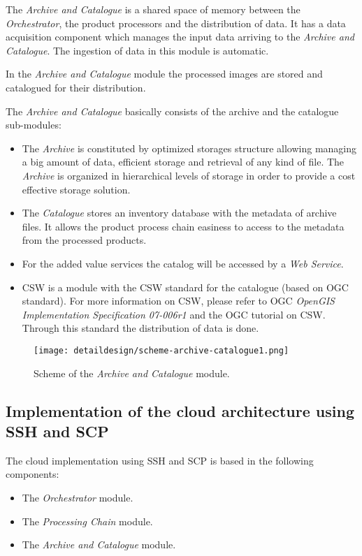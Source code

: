 The \emph{Archive and Catalogue} is a shared space of memory between the
\emph{Orchestrator}, the product processors and the distribution of data. It has
a data acquisition component which manages the input data arriving to the
\emph{Archive and Catalogue}. The ingestion of data in this module is automatic.

In the \emph{Archive and Catalogue} module the processed images are stored and catalogued for their distribution.

The \emph{Archive and Catalogue} basically consists of the archive and the
catalogue sub-modules:
\begin{itemize}
\item The \emph{Archive} is constituted by optimized storages structure allowing managing a big amount of data, efficient storage and retrieval of any kind of file. The \emph{Archive} is organized in hierarchical levels of storage in order to provide a cost effective storage solution.

\item The \emph{Catalogue} stores an inventory database with the metadata of archive files. It allows the product process chain easiness to access to the metadata from the processed products.

\item For the added value services the catalog will be accessed by a \emph{Web Service}.

\item \ac{CSW} is a module with the \ac{CSW} standard for the catalogue (based on \ac{OGC} standard). For more information on \ac{CSW}, please refer to \ac{OGC} \emph{OpenGIS Implementation Specification 07-006r1} and the \ac{OGC} tutorial on \ac{CSW}. Through this standard the distribution of data is done.
\end{itemize}

\begin{figure}[!h]
\begin{center}
\texttt{[image: detaildesign/scheme-archive-catalogue1.png]}
\caption{Scheme of the \emph{Archive and Catalogue} module.}
\label{fig:archive-catalogue-scheme}
\end{center}
\end{figure}



\subsection{Implementation of the cloud architecture using SSH and SCP}
\label{subsec:ssh-cloud}
The cloud implementation using \ac{SSH} and \ac{SCP} is based in the following
components:
\begin{itemize}
\item The \emph{Orchestrator} module.
\item The \emph{Processing Chain} module.
\item The \emph{Archive and Catalogue} module.
\end{itemize}


